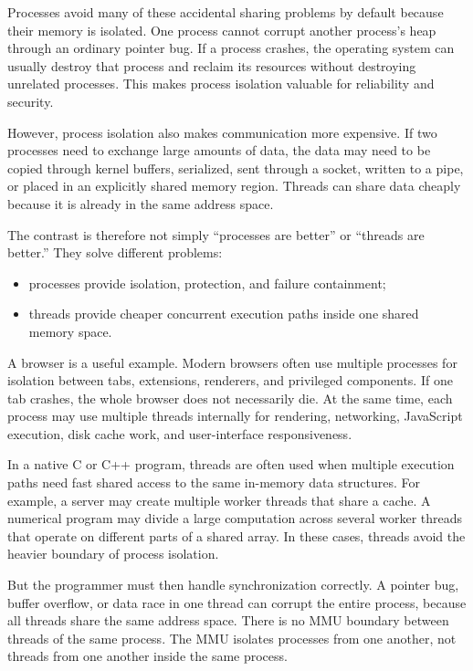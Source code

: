 Processes avoid many of these accidental sharing problems by default because their memory is isolated. One process cannot corrupt another process's heap through an ordinary pointer bug. If a process crashes, the operating system can usually destroy that process and reclaim its resources without destroying unrelated processes. This makes process isolation valuable for reliability and security.

However, process isolation also makes communication more expensive. If two processes need to exchange large amounts of data, the data may need to be copied through kernel buffers, serialized, sent through a socket, written to a pipe, or placed in an explicitly shared memory region. Threads can share data cheaply because it is already in the same address space.

The contrast is therefore not simply ``processes are better'' or ``threads are better.'' They solve different problems:

\begin{itemize}
    \item processes provide isolation, protection, and failure containment;
    \item threads provide cheaper concurrent execution paths inside one shared memory space.
\end{itemize}

A browser is a useful example. Modern browsers often use multiple processes for isolation between tabs, extensions, renderers, and privileged components. If one tab crashes, the whole browser does not necessarily die. At the same time, each process may use multiple threads internally for rendering, networking, JavaScript execution, disk cache work, and user-interface responsiveness.

In a native C or C++ program, threads are often used when multiple execution paths need fast shared access to the same in-memory data structures. For example, a server may create multiple worker threads that share a cache. A numerical program may divide a large computation across several worker threads that operate on different parts of a shared array. In these cases, threads avoid the heavier boundary of process isolation.

But the programmer must then handle synchronization correctly. A pointer bug, buffer overflow, or data race in one thread can corrupt the entire process, because all threads share the same address space. There is no MMU boundary between threads of the same process. The MMU isolates processes from one another, not threads from one another inside the same process.

